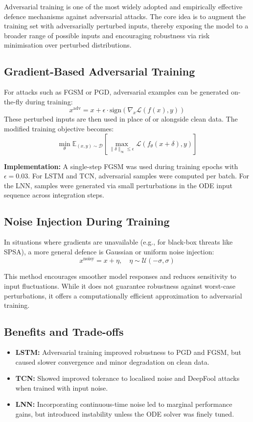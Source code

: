 Adversarial training is one of the most widely adopted and empirically effective defence mechanisms against adversarial attacks. The core idea is to augment the training set with adversarially perturbed inputs, thereby exposing the model to a broader range of possible inputs and encouraging robustness via risk minimisation over perturbed distributions.

\subsection{Gradient-Based Adversarial Training}

For attacks such as FGSM or PGD, adversarial examples can be generated on-the-fly during training:
\[
x^{\text{adv}} = x + \epsilon \cdot \text{sign}(\nabla_x \mathcal{L}(f(x), y))
\]
These perturbed inputs are then used in place of or alongside clean data. The modified training objective becomes:
\[
\min_\theta \mathbb{E}_{(x, y) \sim \mathcal{D}} \left[ \max_{\| \delta \|_\infty \leq \epsilon} \mathcal{L}(f_\theta(x + \delta), y) \right]
\]

\textbf{Implementation:}  
A single-step FGSM was used during training epochs with $\epsilon = 0.03$. For LSTM and TCN, adversarial samples were computed per batch. For the LNN, samples were generated via small perturbations in the ODE input sequence across integration steps.

\subsection{Noise Injection During Training}

In situations where gradients are unavailable (e.g., for black-box threats like SPSA), a more general defence is Gaussian or uniform noise injection:
\[
x^{\text{noisy}} = x + \eta, \quad \eta \sim \mathcal{U}(-\sigma, \sigma)
\]

This method encourages smoother model responses and reduces sensitivity to input fluctuations. While it does not guarantee robustness against worst-case perturbations, it offers a computationally efficient approximation to adversarial training.

\subsection{Benefits and Trade-offs}

\begin{itemize}
    \item \textbf{LSTM:} Adversarial training improved robustness to PGD and FGSM, but caused slower convergence and minor degradation on clean data.
    \item \textbf{TCN:} Showed improved tolerance to localised noise and DeepFool attacks when trained with input noise.
    \item \textbf{LNN:} Incorporating continuous-time noise led to marginal performance gains, but introduced instability unless the ODE solver was finely tuned.
\end{itemize}

